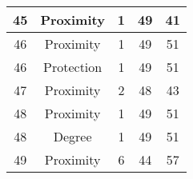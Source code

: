 \documentclass[results.tex]{subfiles}
\begin{document}
\begin{center}
\begin{tabular}{| c || c | c | c | c |}
            \hline
            45                      & Proximity                    & 1                      & 49                      & 41                   \\
            \hline
            46                      & Proximity                    & 1                      & 49                      & 51                   \\
            \hline
            46                      & Protection                   & 1                      & 49                      & 51                   \\
            \hline
            47                      & Proximity                    & 2                      & 48                      & 43                   \\
            \hline
            48                      & Proximity                    & 1                      & 49                      & 51                   \\
            \hline
            48                      & Degree                       & 1                      & 49                      & 51                   \\
            \hline
            49                      & Proximity                    & 6                      & 44                      & 57                   \\
            \hline
        \end{tabular}
    \end{center}
\end{document}

